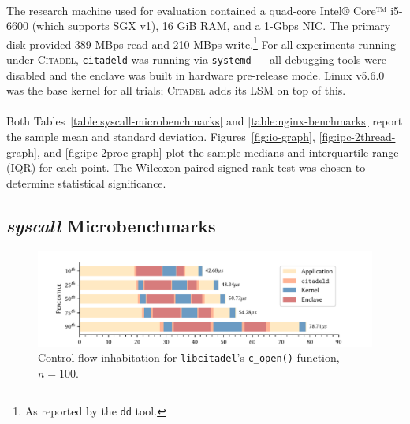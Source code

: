 \paragraph{} The research machine used for evaluation contained a quad-core Intel® Core™ i5-6600 (which supports SGX v1), 16 GiB RAM, and a 1-Gbps NIC. The primary disk provided 389 MBps read and 210 MBps write.\footnote{As reported by the \texttt{dd} tool.} For all experiments running under \textsc{Citadel}, \texttt{citadeld} was running via \texttt{systemd} --- all debugging tools were disabled and the enclave was built in hardware pre-release mode. Linux v5.6.0 was the base kernel for all trials; \textsc{Citadel} adds its LSM on top of this.

\paragraph{} Both Tables~\ref{table:syscall-microbenchmarks} and \ref{table:nginx-benchmarks} report the sample mean and standard deviation. Figures~\ref{fig:io-graph}, \ref{fig:ipc-2thread-graph}, and \ref{fig:ipc-2proc-graph} plot the sample medians and interquartile range (IQR) for each point. The Wilcoxon paired signed rank test was chosen to determine statistical significance.~\cite{10.2307/3001968}

\subsection{\textit{syscall} Microbenchmarks}
\label{sec:syscall-microbenchmarks}

\begin{figure}[]
    \centering
    \includegraphics[width=\linewidth]{figures/graphs/open-anatomy.pdf}
    \vspace{-5mm}
    \caption{Control flow inhabitation for \texttt{libcitadel}'s \texttt{c\_open()} function, $n=100$.}
    \label{fig:open-anatomy}
\end{figure}


